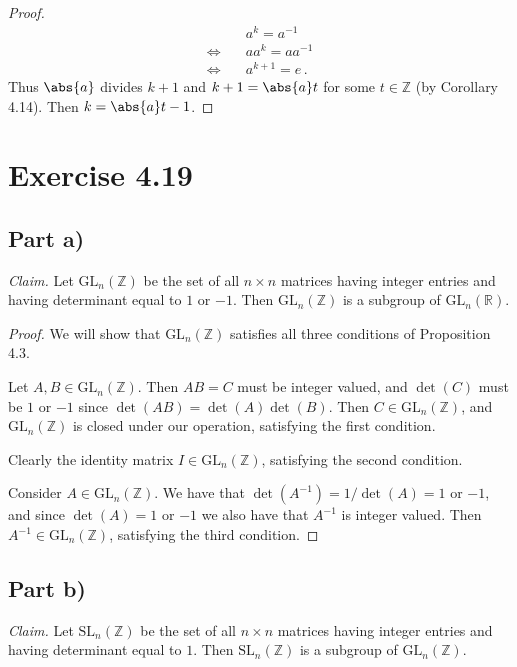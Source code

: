 \documentclass{abrice}
\newcommand{\GL}{\text{GL}}
\newcommand{\Z}{\mathbb{Z}}
\newcommand{\R}{\mathbb{R}}
\begin{document}
\begin{proof}
  \begin{align*}
    & a^k = a^{-1} \\
    \Longleftrightarrow \quad & a a^k = a a^{-1} \\
    \Longleftrightarrow \quad & a^{k+1} = e\, .
  \end{align*}
  Thus $\abs{a}$ divides $k + 1$ and $k + 1 = \abs{a}t$ for some $t \in \Z$ (by
  Corollary 4.14). Then $k = \abs{a}t - 1$.
\end{proof}

\section{Exercise 4.19}

\subsection{Part a)}
\textit{Claim.} Let $\GL_n(\Z)$ be the set of all $n \times n$ matrices
having integer entries and having determinant equal to $1$ or $-1$. Then
$\GL_n(\Z)$ is a subgroup of $\GL_n(\R)$.

\begin{proof}
  We will show that $\GL_n(\Z)$ satisfies all three conditions of
  Proposition 4.3.

  Let $A,B \in \GL_n(\Z)$. Then $AB = C$ must be integer valued, and $\det(C)$
  must be $1$ or $-1$ since $\det(AB) = \det(A)\det(B)$. Then $C \in \GL_n(\Z)$,
  and $\GL_n(\Z)$ is closed under our operation, satisfying the first condition.

  Clearly the identity matrix $I \in \GL_n(\Z)$, satisfying the second condition.

  Consider $A \in \GL_n(\Z)$. We have that $\det(A^{-1}) = 1/\det(A) = 1$ or
  $-1$, and since $\det(A) = 1$ or $-1$ we also have that $A^{-1}$ is integer
  valued. Then $A^{-1} \in \GL_n(\Z)$, satisfying the third condition.
\end{proof}

\subsection{Part b)}
\newcommand{\SL}{\text{SL}}

\textit{Claim.} Let $\SL_n(\Z)$ be the set of all $n
\times n$ matrices having integer entries and having determinant equal to $1$.
Then $\SL_n(\Z)$ is a subgroup of $\GL_n(\Z)$.
\end{document}

